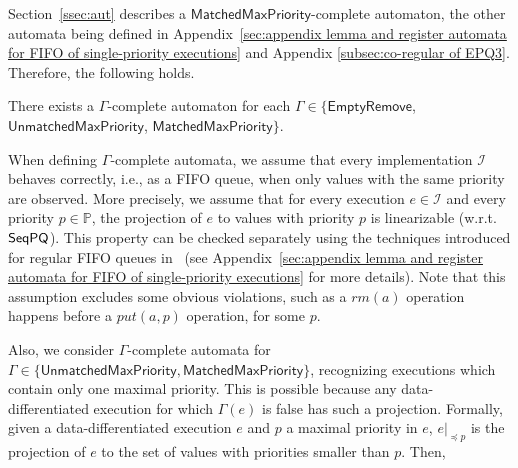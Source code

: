 Section~\ref{ssec:aut} describes a $\mathsf{MatchedMaxPriority}$-complete automaton, the other automata being defined in Appendix~\ref{sec:appendix lemma and register automata for FIFO of single-priority executions} %
and Appendix \ref{subsec:co-regular of EPQ3}. Therefore, the following holds.

\begin{lemma}
There exists a $\Gamma$-complete automaton for each $\Gamma\in \{\mathsf{EmptyRemove}$, $\mathsf{UnmatchedMaxPriority}$, $\mathsf{MatchedMaxPriority}\}$.
\end{lemma}

When defining $\Gamma$-complete automata, we assume that every implementation $\mathcal{I}$ behaves correctly, i.e., as a FIFO queue, when only values with the same priority are observed. More precisely, we assume that for every execution $e\in\mathcal{I}$ and every priority $p\in\mathbb{P}$, the projection of $e$ to values with priority $p$ is linearizable (w.r.t. $\mathsf{SeqPQ}$). This property can be checked separately using the techniques introduced for regular FIFO queues in~\cite{DBLP:conf/icalp/BouajjaniEEH15} (see Appendix~\ref{sec:appendix lemma and register automata for FIFO of single-priority executions} for more details). Note that this assumption excludes some obvious violations, such as a $\textit{rm}(a)$ operation happens before a $\textit{put}(a,p)$ operation, for some $p$.

Also, we consider $\Gamma$-complete automata for $\Gamma\in \{\mathsf{UnmatchedMaxPriority}, \mathsf{MatchedMaxPriority}\}$, recognizing executions which contain only one maximal priority. This is possible because any data-differentiated execution for which $\Gamma(e)$ is false has such a projection.
Formally, given a data-differentiated execution $e$ and $p$ a maximal priority in $e$, $e\vert_{\preceq p}$ is the projection of $e$ to the set of values with priorities smaller than $p$. Then,

